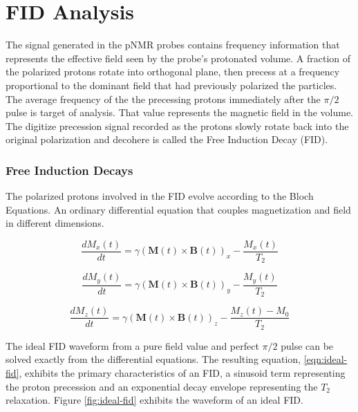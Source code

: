 \chapter{FID Analysis}

The signal generated in the pNMR probes contains frequency information that represents the effective field seen by the probe's protonated  volume.  A fraction of the polarized protons rotate into orthogonal plane, then precess at a frequency proportional to the dominant field that had previously polarized the particles.  The average frequency of the the precessing protons immediately after the $\pi/2$ pulse is target of analysis.  That value represents the magnetic field in the volume.  The digitize precession signal recorded as the protons slowly rotate back into the original polarization and decohere is called the Free Induction Decay (FID).


\subsection{Free Induction Decays}

The polarized protons involved in the FID evolve according to the Bloch Equations.  An ordinary differential equation that couples magnetization and field in different dimensions.

\begin{equation}
\frac{dM_x(t)}{dt} = 
\gamma (\mathbf{M}(t) \times \mathbf{B}(t))_x - \frac{M_x(t)}{T_2}
\label{eqn:bloch-x}
\end{equation}

\begin{equation}
\frac{dM_y(t)}{dt} = 
\gamma (\mathbf{M}(t)\times \mathbf{B}(t))_y - \frac{M_y(t)}{T_2}
\label{eqn:bloch-y}
\end{equation}

\begin{equation}
\frac{dM_z(t)}{dt} = 
\gamma (\mathbf{M}(t) \times \mathbf{B}(t))_z - \frac{M_z(t) - M_0}{T_2}
\label{eqn:bloch-z}
\end{equation}

The ideal FID waveform from a pure field value and perfect $\pi/2$ pulse can be solved exactly from the differential equations.  The resulting equation, \ref{eqn:ideal-fid}, exhibits the primary characteristics of an FID, a sinusoid term representing the proton precession and an exponential decay envelope representing the $T_2$ relaxation.  Figure \ref{fig:ideal-fid} exhibits the waveform of an ideal FID.

